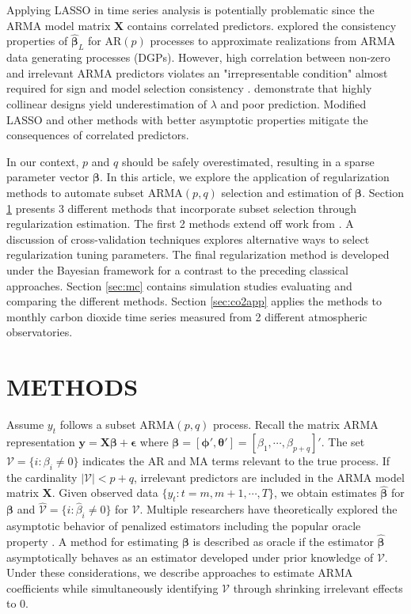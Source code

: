 Applying LASSO in time series analysis is potentially problematic since the ARMA model matrix $\bm{X}$ contains correlated predictors.  \cite{Nardi2011} explored the consistency properties of $\hat{\bm{\beta}}_{L}$ for AR$(p)$ processes to approximate realizations from ARMA data generating processes (DGPs). However, high correlation between non-zero and irrelevant ARMA predictors violates an "irrepresentable condition" almost required for sign and model selection consistency \citep{Zhao2006}. \cite{Hebiri2013} demonstrate that highly collinear designs yield underestimation of $\lambda$ and poor prediction. Modified LASSO and other methods with better asymptotic properties mitigate the consequences of correlated predictors.

In our context, $p$ and $q$ should be safely overestimated, resulting in a sparse parameter vector $\bm{\beta}$. In this article, we explore the application of regularization methods to automate subset ARMA$(p,q)$ selection and estimation of $\bm{\beta}$. Section \ref{sec:methods} presents 3 different methods that incorporate subset selection through regularization estimation. The first 2 methods extend off work from \citep{Chen2011}. A discussion of cross-validation techniques explores alternative ways to select regularization tuning parameters. The final regularization method is developed under the Bayesian framework for a contrast to the preceding classical approaches. Section \ref{sec:mc} contains simulation studies evaluating and comparing the different methods. Section \ref{sec:co2app} applies the methods to monthly carbon dioxide time series measured from 2 different atmospheric observatories.










\section{METHODS}
\label{sec:methods}

Assume $y_t$ follows a subset ARMA$(p,q)$ process. Recall the matrix ARMA representation $\bm{y}=\bm{X}\bm{\beta}+\bm{\epsilon}$ where $\bm{\beta}=[\bm{\phi}',\bm{\theta}']=[\beta_1,\cdots,\beta_{p+q}]'$. The set $\mathcal{V}=\{i:\beta_i\neq 0\}$ indicates the AR and MA terms relevant to the true process. If the cardinality $|\mathcal{V}|<p+q$, irrelevant predictors are included in the ARMA model matrix $\bm{X}$. Given observed data $\{y_t: t=m,m+1,\cdots,T\}$, we obtain estimates $\hat{\bm{\beta}}$ for $\bm{\beta}$ and $\hat{\mathcal{V}}=\{i:\hat{\beta}_i\neq 0\}$ for $\mathcal{V}$. Multiple researchers have theoretically explored the asymptotic behavior of penalized estimators including the popular oracle property \citep{Fan2001,Fan2004,Fan2011}. A method for estimating $\bm{\beta}$ is described as oracle if the estimator $\hat{\bm{\beta}}$ asymptotically behaves as an estimator developed under prior knowledge of $\mathcal{V}$. Under these considerations, we describe approaches to estimate ARMA coefficients while simultaneously identifying $\mathcal{V}$ through shrinking irrelevant effects to 0.

